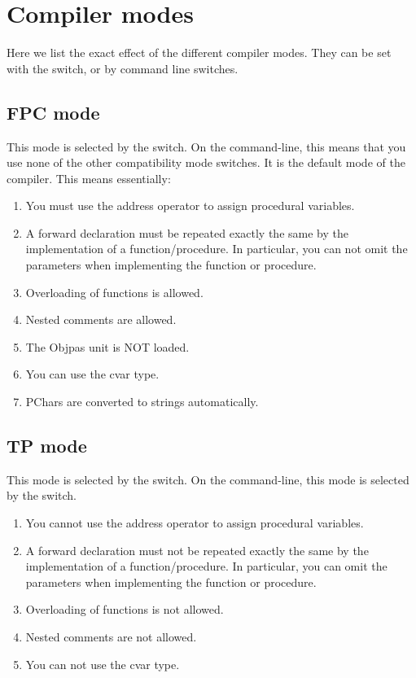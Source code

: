 \documentclass{report}
\begin{document}
\chapter{Compiler modes}
\label{ch:AppD}

Here we list the exact effect of the different compiler modes. They can be
set with the  switch, or by command line switches.

\section{FPC mode}
This mode is selected by the  switch. On the command-line,
this means that you use none of the other compatibility mode switches.
It is the default mode of the compiler. This means essentially:
\begin{enumerate}
\item You must use the address operator to assign procedural variables.
\item A forward declaration must be repeated exactly the same by the
implementation of a function/procedure. In particular, you can not omit the
parameters when implementing the function or procedure.
\item Overloading of functions is allowed.
\item Nested comments are allowed.
\item The Objpas unit is NOT loaded.
\item You can use the cvar type.
\item PChars are converted to strings automatically.
\end{enumerate}
\section{TP mode}
This mode is selected by the  switch. On the command-line,
this mode is selected by the  switch.

\begin{enumerate}
\item You cannot use the address operator to assign procedural variables.
\item A forward declaration must not be repeated exactly the same by the
implementation of a function/procedure. In particular, you can omit the
parameters when implementing the function or procedure.
\item Overloading of functions is not allowed.
\item Nested comments are not allowed.
\item You can not use the cvar type.
\end{enumerate}
\end{document}
